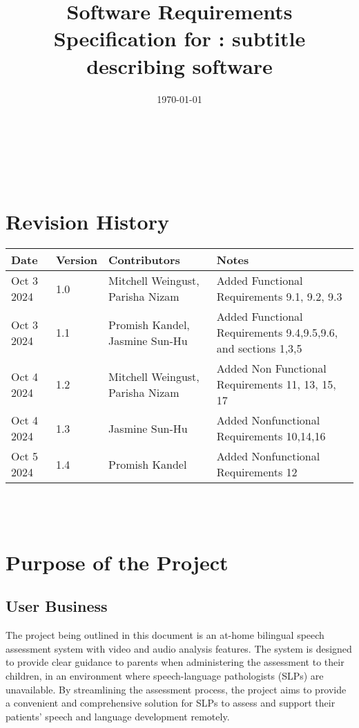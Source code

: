 \documentclass[12pt]{article}
\begin{document}
\title{Software Requirements Specification for \progname: subtitle describing software} 
\author{\authname}
\date{\today}
	
\maketitle

~\newpage


\tableofcontents

~\newpage

\section*{Revision History}

\begin{tabularx}{\textwidth}{p{2cm}p{1.5cm}p{3.5cm}X}
\toprule {\textbf{Date}} & {\textbf{Version}} & {\textbf{Contributors}} & {\textbf{Notes}}\\
\midrule
Oct 3 2024 & 1.0 & Mitchell Weingust, Parisha Nizam & Added Functional Requirements 9.1, 9.2, 9.3 \\
Oct 3 2024 & 1.1 & Promish Kandel, Jasmine Sun-Hu & Added Functional Requirements 9.4,9.5,9.6, and sections 1,3,5\\
Oct 4 2024 & 1.2 & Mitchell Weingust, Parisha Nizam & Added Non Functional Requirements 11, 13, 15, 17\\
Oct 4 2024 & 1.3 & Jasmine Sun-Hu & Added Nonfunctional Requirements 10,14,16\\
Oct 5 2024 & 1.4 & Promish Kandel & Added Nonfunctional Requirements 12\\
\bottomrule
\end{tabularx}

~\\

~\newpage
\section{Purpose of the Project}
\subsection{User Business}
\hspace{2em}The project being outlined in this document is an at-home bilingual speech 
assessment system with video and audio analysis features. The system is designed 
to provide clear guidance to parents when administering the assessment to their 
children, in an environment where speech-language pathologists (SLPs) are 
unavailable. By streamlining the assessment process, the project aims to provide a 
convenient and comprehensive solution for SLPs to assess and support their patients'
speech and language development remotely. 
\end{document}
